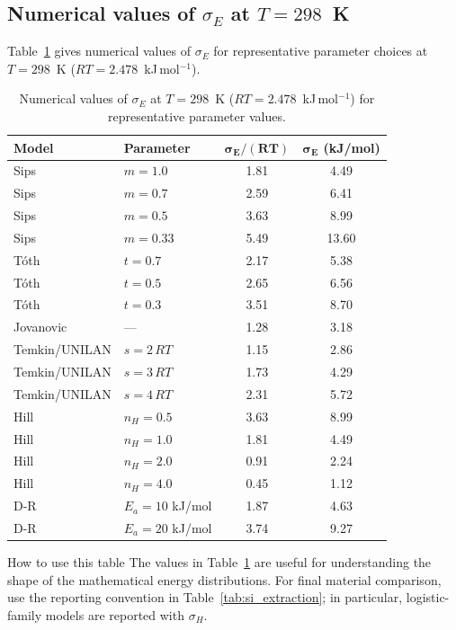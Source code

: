 \documentclass[journal=jacsat,manuscript=article]{achemso}
\begin{document}
\subsection{Numerical values of $\sigma_E$ at $T = 298$~K}
\label{sec:si_sigma_numerical}

Table~\ref{tab:si_sigma_numerical} gives numerical values of $\sigma_E$
for representative parameter choices at $T = 298$~K
($RT = 2.478$~kJ\,mol$^{-1}$).

\begin{table}[H]
	\centering
	\small
	\caption{Numerical values of $\sigma_E$ at $T = 298$~K
		($RT = 2.478$~kJ\,mol$^{-1}$) for representative parameter values.}
	\label{tab:si_sigma_numerical}
	\renewcommand{\arraystretch}{1.3}
	\begin{tabular}{@{} l l c c @{}}
		\toprule
		\textbf{Model} & \textbf{Parameter}
		& $\boldsymbol{\sigma_E/(RT)}$
		& $\boldsymbol{\sigma_E}$ (kJ/mol) \\
		\midrule
		Sips & $m = 1.0$ & 1.81 & 4.49 \\
		Sips & $m = 0.7$ & 2.59 & 6.41 \\
		Sips & $m = 0.5$ & 3.63 & 8.99 \\
		Sips & $m = 0.33$ & 5.49 & 13.60 \\
		\midrule
		T\'{o}th & $t = 0.7$ & 2.17 & 5.38 \\
		T\'{o}th & $t = 0.5$ & 2.65 & 6.56 \\
		T\'{o}th & $t = 0.3$ & 3.51 & 8.70 \\
		\midrule
		Jovanovic & --- & 1.28 & 3.18 \\
		\midrule
		Temkin/UNILAN & $s = 2\,RT$ & 1.15 & 2.86 \\
		Temkin/UNILAN & $s = 3\,RT$ & 1.73 & 4.29 \\
		Temkin/UNILAN & $s = 4\,RT$ & 2.31 & 5.72 \\
		\midrule
		Hill & $n_H = 0.5$ & 3.63 & 8.99 \\
		Hill & $n_H = 1.0$ & 1.81 & 4.49 \\
		Hill & $n_H = 2.0$ & 0.91 & 2.24 \\
		Hill & $n_H = 4.0$ & 0.45 & 1.12 \\
		\midrule
		D-R & $E_a = 10$ kJ/mol & 1.87 & 4.63 \\
		D-R & $E_a = 20$ kJ/mol & 3.74 & 9.27 \\
		\bottomrule
	\end{tabular}
\end{table}

\begin{greenbox}{How to use this table}
	The values in Table~\ref{tab:si_sigma_numerical} are useful for
	understanding the shape of the mathematical energy distributions. For
	final material comparison, use the reporting convention in
	Table~\ref{tab:si_extraction}; in particular, logistic-family models
	are reported with \(\sigma_H\).
\end{greenbox}
\end{document}
